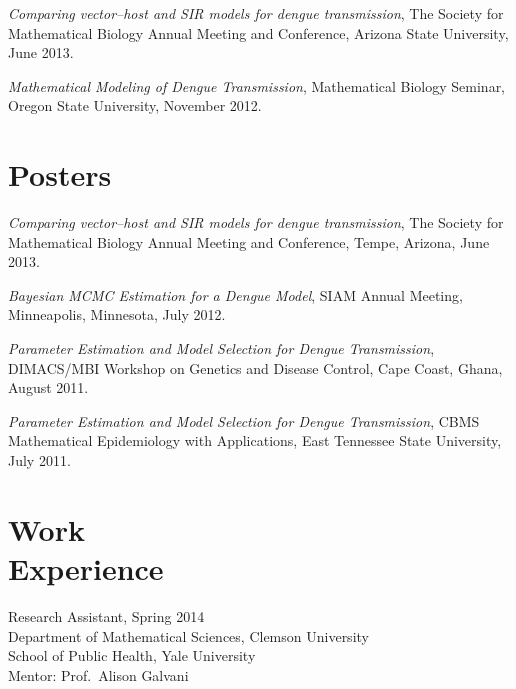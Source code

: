 \documentclass[margin,line,pifont,palatino,courier]{res}
\begin{document}
\begin{resume}
\emph{Comparing vector--host and SIR models for dengue transmission}, The Society for Mathematical Biology
Annual Meeting and Conference, Arizona State University, June 2013.

\emph{Mathematical Modeling of Dengue Transmission}, Mathematical Biology Seminar, Oregon State University, November 2012.








\section{\sc Posters}

\emph{Comparing vector--host and SIR models for dengue transmission},
The Society for Mathematical Biology Annual Meeting and Conference,
Tempe, Arizona, June 2013.

\emph{Bayesian MCMC Estimation for a Dengue Model}, SIAM Annual
Meeting, Minneapolis, Minnesota, July 2012.

\emph{Parameter Estimation and Model Selection for Dengue
  Transmission}, DIMACS/MBI Workshop on Genetics and Disease Control,
Cape Coast, Ghana, August 2011.

\emph{Parameter Estimation and Model Selection for Dengue
  Transmission}, CBMS Mathematical Epidemiology with Applications,
East Tennessee State University, July 2011.


\section{\sc Work \\ Experience}
Research Assistant, Spring 2014 \\
Department of Mathematical Sciences, Clemson University \\
School of Public Health, Yale University \\
Mentor: Prof.~Alison Galvani


\end{resume}
\end{document}
